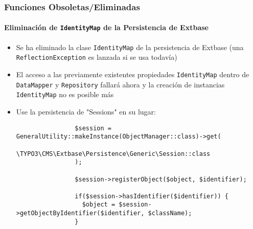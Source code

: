 \begin{frame}[fragile]
	\frametitle{Funciones Obsoletas/Eliminadas}
	\framesubtitle{Eliminación de \texttt{IdentityMap} de la Persistencia de Extbase}

	\lstset{basicstyle=\tiny\ttfamily}

	\begin{itemize}

		\item Se ha eliminado la clase \texttt{IdentityMap} de la persistencia de Extbase\newline
			\small(una \texttt{ReflectionException} es lanzada si se usa todavía)\normalsize

		\item El acceso a las previamente existentes propiedades  \texttt{IdentityMap} dentro de
			\texttt{DataMapper} y \texttt{Repository} fallará ahora y la creación de
			instancias \texttt{IdentityMap} no es posible más

		\item Use la persistencia de "Sessions" en su lugar:

			\begin{lstlisting}
				$session = GeneralUtility::makeInstance(ObjectManager::class)->get(
				  \TYPO3\CMS\Extbase\Persistence\Generic\Session::class
				);

				$session->registerObject($object, $identifier);

				if($session->hasIdentifier($identifier)) {
				  $object = $session->getObjectByIdentifier($identifier, $className);
				}
			\end{lstlisting}

	\end{itemize}

\end{frame}


